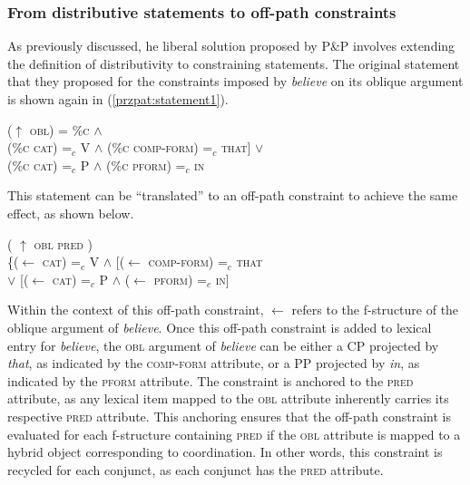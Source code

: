 \subsubsection{From distributive statements to off-path constraints}

As previously discussed, he liberal solution proposed by P\&P involves extending the definition of distributivity to constraining statements. The original statement that they proposed for the constraints imposed by \textit{believe} on its oblique argument is shown again in (\ref{przpat:statement1}).

\ex
\label{przpat:statement1}
($\uparrow$ \textsc{obl}) = \%\textsc{c} $\land$ \\
\vspace{3pt}\text{[[}(\%\textsc{c cat}) =$_c$ V $\land$ (\%\textsc{c comp-form}) =$_c$ \textsc{that}] $\lor$ \\
\text{[}(\%\textsc{c cat}) =$_c$ P $\land$ (\%\textsc{c pform}) =$_c$ \textsc{in}\text{]]}
\xe

This statement can be ``translated'' to an off-path constraint to achieve the same effect, as shown below.


\ex
( $\uparrow$  \textsc{obl} \hspace*{9em} \textsc{pred} \hspace*{9.5em}) \\
\hspace*{3em} \{($\leftarrow$ \textsc{cat}) =$_{c}$ V \hspace*{0.5em} $\land$ \hspace*{0.5em} [($\leftarrow$ \textsc{comp-form}) =$_{c}$ \textsc{that} \\
\hspace*{4em} $\lor$ [($\leftarrow$ \textsc{cat}) =$_{c}$ P \hspace*{0.5em} $\land$ \hspace*{0.5em} ($\leftarrow$ \textsc{pform}) =$_{c}$ \textsc{in}]
\xe

Within the context of this off-path constraint, $\leftarrow$ refers to the f-structure of the oblique argument of \textit{believe}. Once this off-path constraint is added to lexical entry for \textit{believe}, the \textsc{obl} argument of \textit{believe} can be either a CP projected by \textit{that}, as indicated by the \textsc{comp-form} attribute, or a PP projected by \textit{in}, as indicated by the \textsc{pform} attribute. The constraint is anchored to the \textsc{pred} attribute, as any lexical item mapped to the \textsc{obl} attribute inherently carries its respective \textsc{pred} attribute. This anchoring ensures that the off-path constraint is evaluated for each f-structure containing \textsc{pred} if the \textsc{obl} attribute is mapped to a hybrid object corresponding to coordination. In other words, this constraint is recycled for each conjunct, as each conjunct has the \textsc{pred} attribute. 


